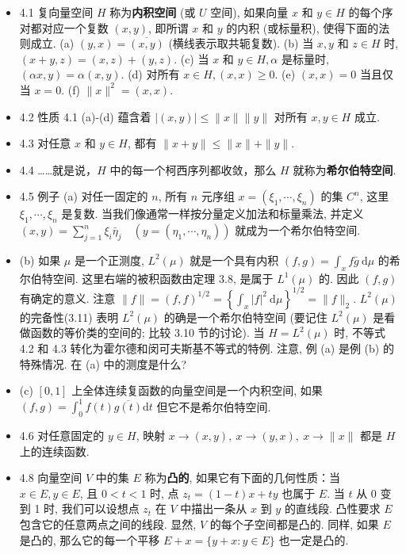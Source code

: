 \begin{itemize}
\item 4.1 复向量空间 $H$ 称为\textbf{内积空间} (或 $U$ 空间), 如果向量 $x$ 和 $y \in H$ 的每个序对都对应一个复数 $(x, y)$, 即所谓 $x$ 和 $y$ 的内积 (或标量积), 使得下面的法则成立. (a) $(y, x)=\overline{(x, y)}$ (横线表示取共轭复数). (b) 当 $x, y$ 和 $z \in H$ 时, $(x+y, z)=(x, z)+(y, z)$. (c) 当 $x$ 和 $y \in H, \alpha$ 是标量时, $(\alpha x, y)=\alpha(x, y)$. (d) 对所有 $x \in H,(x, x) \geqslant 0$. (e) $(x, x)=0$ 当且仅当 $x=0$. (f) $\|x\|^{2}=(x, x)$.

\item 4.2 性质 4.1 (a)-(d) 蕴含着 $|(x, y)| \leqslant\|x\|\|y\|$ 对所有 $x, y \in H$ 成立.

\item 4.3 对任意 $x$ 和 $y \in H$, 都有 $\|x+y\| \leqslant\|x\|+\|y\|$.

\item 4.4 ……就是说，$H$ 中的每一个柯西序列都收敛，那么 $H$ 就称为\textbf{希尔伯特空间}.

\item 4.5 例子 (a) 对任一固定的 $n$, 所有 $n$ 元序组 $x=\left(\xi_{1}, \cdots, \xi_{n}\right)$ 的集 $C^{n}$, 这里 $\xi_{1}, \cdots, \xi_{n}$ 是复数. 当我们像通常一样按分量定义加法和标量乘法, 并定义 $(x, y)=\sum_{j=1}^{n} \xi_{i} \bar{\eta}_{j} \quad\left(y=\left(\eta_{1}, \cdots, \eta_{n}\right)\right)$ 就成为一个希尔伯特空间.

\item (b) 如果 $\mu$ 是一个正测度, $L^{2}(\mu)$ 就是一个具有内积 $(f, g)=\int_{x} f \bar{g} \mathrm{~d} \mu$ 的希尔伯特空间. 这里右端的被积函数由定理 3.8, 是属于 $L^1(\mu)$ 的. 因此 $(f, g)$ 有确定的意义. 注意 $\|f\|=(f, f)^{1 / 2}=\left\{\int_{x}|f|^{2} \mathrm{~d} \mu\right\}^{1 / 2}=\|f\|_{2}$. $L^{2}(\mu)$ 的完备性(3.11) 表明 $L^{2}(\mu)$ 的确是一个希尔伯特空间 (要记住 $L^{2}(\mu)$ 是看做函数的等价类的空间的; 比较 3.10 节的讨论). 当 $H=L^{2}(\mu)$ 时, 不等式 4.2 和 4.3 转化为霍尔德和闵可夫斯基不等式的特例. 注意, 例 (a) 是例 (b) 的特殊情况. 在 (a) 中的测度是什么?

\item (c) $[0,1]$ 上全体连续复函数的向量空间是一个内积空间, 如果 $(f, g)=\int_{0}^{1} f(t) \overline{g(t)} \mathrm{d} t$ 但它不是希尔伯特空间.

\item 4.6 对任意固定的 $y \in H$, 映射 $x \rightarrow(x, y),\ x \rightarrow(y, x),\ x \rightarrow\|x\|$ 都是 $H$ 上的连续函数.

\item 4.8 向量空间 $V$ 中的集 $E$ 称为\textbf{凸的}, 如果它有下面的几何性质：当 $x \in E, y \in E$, 且 $0<t<1$ 时, 点 $z_{t}=(1-t) x+t y$ 也属于 $E$. 当 $t$ 从 0 变到 1 时, 我们可以设想点 $z_{t}$ 在 $V$ 中描出一条从 $x$ 到 $y$ 的直线段. 凸性要求 $E$ 包含它的任意两点之间的线段. 显然, $V$ 的每个子空间都是凸的. 同样, 如果 $E$ 是凸的, 那么它的每一个平移 $E+x=\{y+x: y \in E\}$ 也一定是凸的.


\end{itemize}
